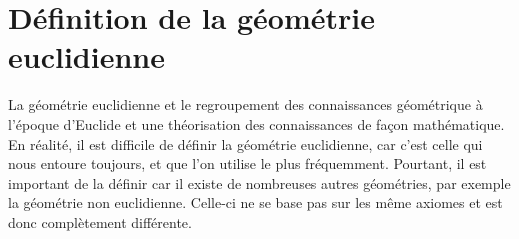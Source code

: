 \documentclass[a4paper,12pt]{article}
\begin{document}
\section{Définition de la géométrie euclidienne}
La géométrie euclidienne et le regroupement des connaissances géométrique à l'époque d'Euclide et une théorisation des connaissances de façon mathématique. En réalité, il est difficile de définir la géométrie euclidienne, car c'est celle qui nous entoure toujours, et que l'on utilise le plus fréquemment. Pourtant, il est important de la définir car il existe de nombreuses autres géométries, par exemple la géométrie non euclidienne. Celle-ci ne se base pas sur les même axiomes et est donc complètement différente.
\end{document}

